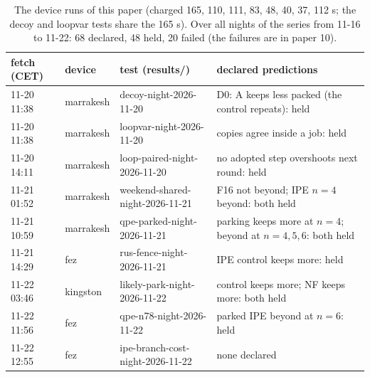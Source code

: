 \documentclass[10pt,a4paper]{article}
\begin{document}
\begin{table}[H]\centering\footnotesize
\setlength{\tabcolsep}{3.5pt}
\begin{tabular}{llll}
\toprule
fetch (CET) & device & test (results/) & declared predictions \\
\midrule
11-20 11:38 & marrakesh & decoy-night-2026-11-20 & D0: A keeps less packed (the control repeats): held \\
11-20 11:38 & marrakesh & loopvar-night-2026-11-20 & copies agree inside a job: held \\
11-20 14:11 & marrakesh & loop-paired-night-2026-11-20 & no adopted step overshoots next round: held \\
11-21 01:52 & marrakesh & weekend-shared-night-2026-11-21 & F16 not beyond; IPE $n=4$ beyond: both held \\
11-21 10:59 & marrakesh & qpe-parked-night-2026-11-21 & parking keeps more at $n=4$; beyond at $n=4,5,6$: both held \\
11-21 14:29 & fez & rus-fence-night-2026-11-21 & IPE control keeps more: held \\
11-22 03:46 & kingston & likely-park-night-2026-11-22 & control keeps more; NF keeps more: both held \\
11-22 11:56 & fez & qpe-n78-night-2026-11-22 & parked IPE beyond at $n=6$: held \\
11-22 12:55 & fez & ipe-branch-cost-night-2026-11-22 & none declared \\
\bottomrule
\end{tabular}
\caption{The device runs of this paper (charged 165, 110, 111, 83, 48, 40, 37, 112 s; the decoy and loopvar tests
share the 165 s). Over all nights of the series from 11-16 to 11-22: 68 declared, 48 held, 20 failed (the failures are in paper
10).}\label{tab:runs}
\end{table}
\end{document}
